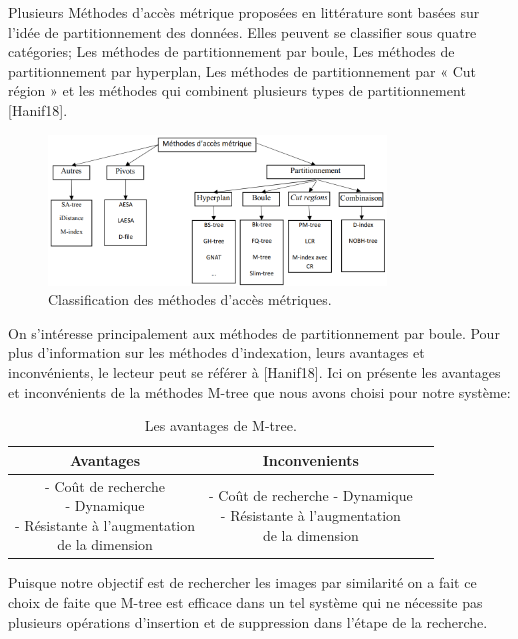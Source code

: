 Plusieurs Méthodes d’accès métrique proposées en littérature sont basées sur l’idée de partitionnement des données. Elles peuvent se classifier sous quatre catégories; Les méthodes de partitionnement par boule, Les méthodes de partitionnement par hyperplan, Les méthodes de partitionnement par « Cut région » et les méthodes qui combinent plusieurs types de partitionnement [Hanif18].
\begin{figure}[H]
	\centering
	\includegraphics[width=0.8\textwidth]{Figures/class.png} %
	\caption{ Classification des méthodes d’accès métriques.}
\end{figure}
On s'intéresse principalement aux méthodes de partitionnement par boule.
Pour plus d'information sur les méthodes d'indexation, leurs avantages et inconvénients, le lecteur peut se référer à [Hanif18]. Ici on présente les avantages et inconvénients de la méthodes M-tree que nous avons choisi pour notre système:
\begin{table}[H]
	\centering
	\caption{Les avantages de M-tree.}
	\begin{tabular}{|c|c|c|}
		\hline
		\textbf{Avantages} & \textbf{Inconvenients}\\
		\hline
		\makecell{- Coût de recherche\\
			- Dynamique\\
			- Résistante à l’augmentation\\
			 de la dimension} 
		& \makecell{- Coût de recherche
			- Dynamique\\
			- Résistante à l’augmentation\\
			 de la dimension}   \\
		\hline
	
	\end{tabular}
	
\end{table}
Puisque notre objectif est de rechercher les images par similarité on a fait ce choix de faite que M-tree est efficace dans un tel système qui ne nécessite pas plusieurs opérations d'insertion et de suppression dans l'étape de la recherche.
